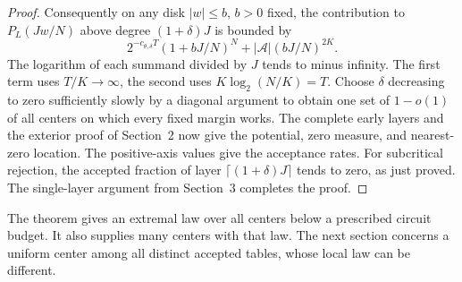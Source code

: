 \begin{proof}
Consequently on any disk $|w|\le b$, $b>0$ fixed, the contribution to $P_L(Jw/N)$ above degree $(1+\delta)J$ is bounded by
\[
 2^{-c_{\theta,\delta}T}(1+bJ/N)^N+
                 |\mathcal A|(bJ/N)^{2K}.
\]
The logarithm of each summand divided by $J$ tends to minus infinity. The first term uses $T/K\to\infty$, the second uses $K\log_2(N/K)=T$. Choose $\delta$ decreasing to zero sufficiently slowly by a diagonal argument to obtain one set of $1-o(1)$ of all centers on which every fixed margin works. The complete early layers and the exterior proof of Section~2 now give the potential, zero measure, and nearest-zero location. The positive-axis values give the acceptance rates. For subcritical rejection, the accepted fraction of layer $\lceil(1+\delta)J\rceil$ tends to zero, as just proved. The single-layer argument from Section~3 completes the proof.
\end{proof}

The theorem gives an extremal law over all centers below a prescribed circuit budget. It also supplies many centers with that law. The next section concerns a uniform center among all distinct accepted tables, whose local law can be different.
